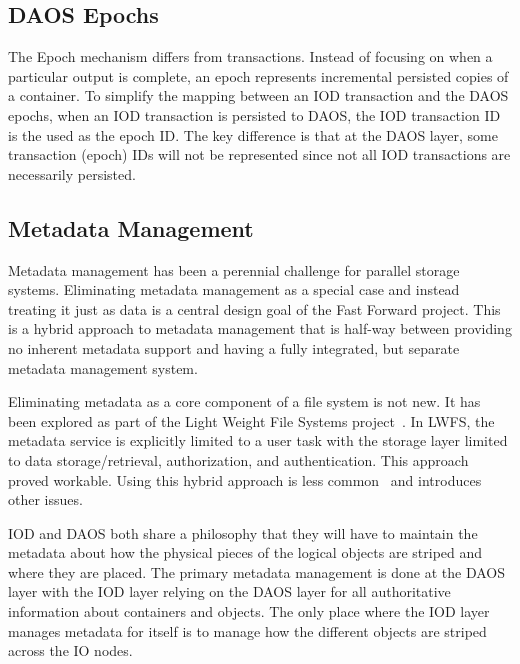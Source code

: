 \documentclass[conference]{IEEEtran}
\begin{document}
\subsection{DAOS Epochs}
The Epoch mechanism differs from transactions. Instead of focusing on when a
particular output is complete, an epoch represents incremental persisted copies
of a container. To simplify the mapping between an IOD transaction and the DAOS
epochs, when an IOD transaction is persisted to DAOS, the IOD transaction ID is
the used as the epoch ID. The key difference is that at the DAOS layer, some
transaction (epoch) IDs will not be represented since not all IOD transactions
are necessarily persisted.

\subsection{Metadata Management}
Metadata management has been a perennial challenge for parallel storage
systems.  Eliminating metadata management as a special case and instead
treating it just as data is a central design goal of the Fast Forward project.
This is a hybrid approach to metadata management that is half-way between
providing no inherent metadata support and having a fully integrated, but
separate metadata management system.

Eliminating metadata as a core component of a file system is not new. It has
been explored as part of the Light Weight File Systems
project~\cite{oldfield:lwfs}. In LWFS, the metadata service is explicitly
limited to a user task with the storage layer limited to data
storage/retrieval, authorization, and authentication. This approach proved
workable. Using this hybrid approach is less common~\cite{weil:2006:ceph} and
introduces other issues.

IOD and DAOS both share a philosophy that they will have to maintain the
metadata about how the physical pieces of the logical objects are striped and
where they are placed. The primary metadata management is done at the DAOS
layer with the IOD layer relying on the DAOS layer for all authoritative
information about containers and objects. The only place where the IOD layer
manages metadata for itself is to manage how the different objects are striped
across the IO nodes.
\end{document}
